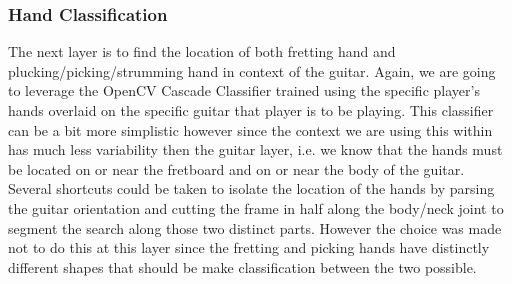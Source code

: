 \subsubsection{Hand Classification}
The next layer is to find the location of both fretting hand and plucking/picking/strumming hand in context of the guitar.
Again, we are going to leverage the OpenCV Cascade Classifier trained using the specific player's hands overlaid on the
specific guitar that player is to be playing.
This classifier can be a bit more simplistic however since the context we are using this 
within has much less variability then the guitar layer, 
i.e. we know that the hands must be located on or near the fretboard and on or near the body of the guitar.
Several shortcuts could be taken to isolate the location of the hands by parsing the guitar orientation
and cutting the frame in half along the body/neck joint to segment the search along those two distinct parts.
However the choice was made not to do this at this layer since the fretting and picking hands have distinctly
different shapes that should be make classification between the two possible.

